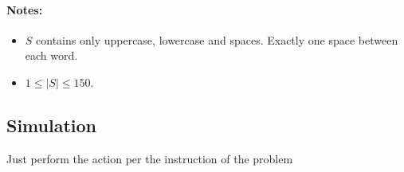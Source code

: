 \paragraph{Notes:}

\begin{itemize}
\item $S$ contains only uppercase, lowercase and spaces. Exactly one space between each word.
\item $1 \leq \lvert S\rvert \leq 150$.
\end{itemize}

\subsection{Simulation}
Just perform the action per the instruction of the problem

\setcounter{lstlisting}{0}
